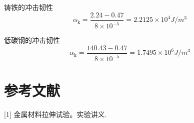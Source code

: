 \documentclass{article}
\begin{document}
铸铁的冲击韧性 
$$
\alpha_{\mathrm{k}}=\frac{2.24-0.47}{8\times {10}^{-5}}=2.2125\times {10}^{4}J/m^3
$$

低碳钢的冲击韧性 
$$
\alpha_{\mathrm{k}}=\frac{140.43-0.47}{8\times {10}^{-5}}=1.7495\times {10}^{6}J/m^3
$$

\section{参考文献}
[1] 金属材料拉伸试验。实验讲义.























\end{document}
